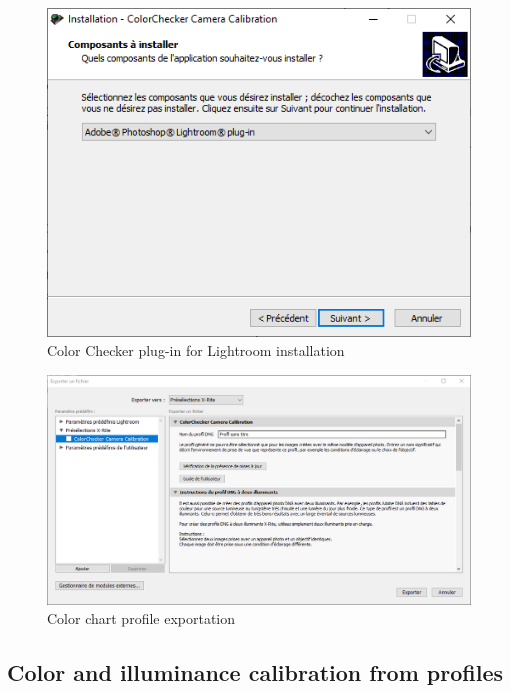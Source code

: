 \documentclass[
]{book}
\begin{document}
\begin{figure}

{\centering \includegraphics[width=0.8\linewidth]{Figures/color_checker_plug_in_win} 

}

\caption{Color Checker plug-in for Lightroom installation}\label{fig:ColorCheckerplugin}
\end{figure}

\begin{figure}

{\centering \includegraphics[width=0.8\linewidth]{Figures/x_rite_preselection} 

}

\caption{Color chart profile exportation}\label{fig:xritepreselection}
\end{figure}

\hypertarget{color-and-illuminance-calibration-from-profiles}{%
\subsection{Color and illuminance calibration from profiles}\label{color-and-illuminance-calibration-from-profiles}}
\end{document}
